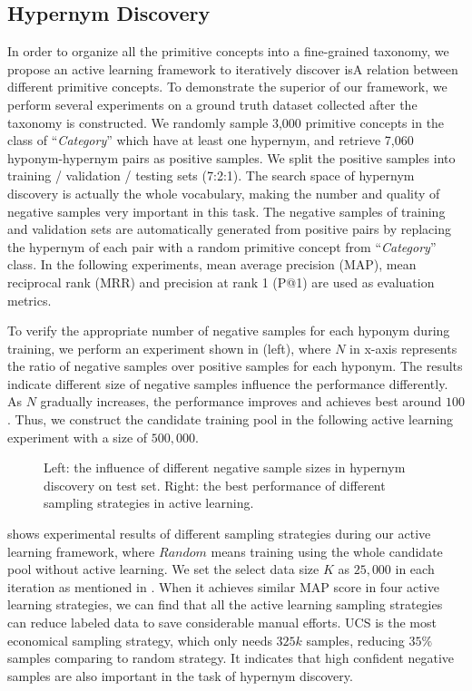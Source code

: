 
\subsection{Hypernym Discovery}

In order to organize all the primitive concepts into a fine-grained taxonomy,
we propose an active learning framework to iteratively 
discover isA relation between different primitive concepts.
To demonstrate the superior of our framework, 
we perform several experiments on a ground truth dataset collected after the taxonomy is constructed.
We randomly sample 3,000 primitive concepts in the class of ``\textit{Category}'' which have at least one hypernym, and retrieve 7,060 hyponym-hypernym pairs as positive samples.
We split the positive samples into training / validation / testing sets (7:2:1).
The search space of hypernym discovery is actually the whole vocabulary, 
making the number and quality of negative samples very important in this task.
The negative samples of training and validation sets are automatically generated from positive pairs
by replacing the hypernym of each pair with a random primitive concept from ``\textit{Category}'' class.
In the following experiments, mean average precision (MAP), mean reciprocal rank (MRR) and precision at rank 1 (P@1) are used as evaluation metrics. 

To verify the appropriate number of negative samples for each hyponym during training,
we perform an experiment shown in (left), 
where $N$ in x-axis represents the ratio of negative samples over positive samples for each hyponym.
The results indicate different size of negative samples influence the performance differently.
As $N$ gradually increases, the performance improves and achieves best around $100$.
Thus, we construct the candidate training pool in the following active learning experiment with a size of $500,000$.

\begin{figure}[th]
	\centering
	\caption{Left: the influence of different negative sample sizes in hypernym discovery on test set. Right: the best performance of different sampling strategies in active learning.}
	\label{fig:isa}
\end{figure}

 shows experimental results of different sampling strategies during our active learning framework, 
where $Random$ means training using the whole candidate pool without active learning.
We set the select data size $K$ as $25,000$ in each iteration as mentioned in .
When it achieves similar MAP score in four active learning strategies,
we can find that all the active learning sampling strategies can reduce labeled data to save considerable manual efforts.
UCS is the most economical sampling strategy, which only needs $325k$ samples, reducing $35\%$ samples comparing to random strategy.
It indicates that high confident negative samples are also important in the task of hypernym discovery.

